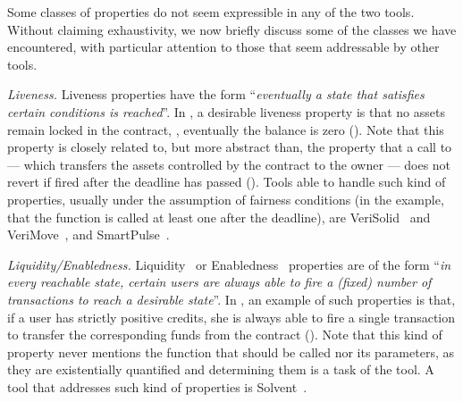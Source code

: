 
Some classes of properties do not seem expressible in any of the two tools. 
Without claiming exhaustivity, we now briefly discuss some of the classes we have encountered, with particular attention to those that seem addressable by other tools.


 \emph{Liveness.} Liveness properties have the form %
 ``\emph{eventually a state that satisfies certain conditions is reached}''.
In , a desirable liveness property is that no assets remain locked in the contract, \ie, eventually the balance is zero (). 
Note that this property is closely related to, but more abstract than, the property that a call to  --- which transfers the assets controlled by the contract to the owner ---
does not revert if fired after the deadline has passed (). 
Tools able to handle such kind of properties, usually under the assumption of fairness conditions (in the example, that the  function is called at least one after the deadline), are VeriSolid~\cite{VeriSolid} and VeriMove~\cite{VeriMove}, and SmartPulse~\cite{Stephens21sp}.

\emph{Liquidity/Enabledness.} Liquidity~\cite{Solvent} or Enabledness~\cite{Schiffl24fmbc}  properties are of the form %
``\emph{in every reachable state, certain users are always able to 
fire a (fixed) number of transactions
to reach a desirable state}''. 
In , an example of such properties is that, if a user has strictly positive credits, she is  always able to fire a single transaction %
to transfer the corresponding funds  from the contract (). Note that this kind of property never mentions the function that should be called nor its parameters, as they  are existentially quantified and determining them is a task of the tool. A tool that addresses such kind of properties is Solvent~\cite{Solvent}.

